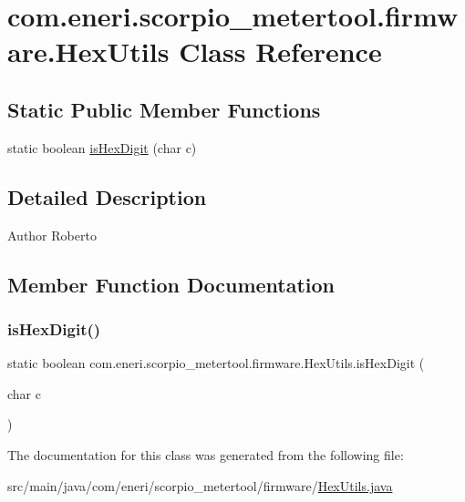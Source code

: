 \hypertarget{classcom_1_1eneri_1_1scorpio__metertool_1_1firmware_1_1_hex_utils}{}\section{com.\+eneri.\+scorpio\+\_\+metertool.\+firmware.\+Hex\+Utils Class Reference}
\label{classcom_1_1eneri_1_1scorpio__metertool_1_1firmware_1_1_hex_utils}
\subsection*{Static Public Member Functions}
\begin{DoxyCompactItemize}
\item 
static boolean \hyperlink{classcom_1_1eneri_1_1scorpio__metertool_1_1firmware_1_1_hex_utils_a7fb7793e8b93b4587f2b60de80c67e02}{is\+Hex\+Digit} (char c)
\end{DoxyCompactItemize}


\subsection{Detailed Description}
\begin{DoxyAuthor}{Author}
Roberto 
\end{DoxyAuthor}


\subsection{Member Function Documentation}
\mbox{\label{classcom_1_1eneri_1_1scorpio__metertool_1_1firmware_1_1_hex_utils_a7fb7793e8b93b4587f2b60de80c67e02}} 
\subsubsection{\texorpdfstring{is\+Hex\+Digit()}{isHexDigit()}}
{\footnotesize\ttfamily static boolean com.\+eneri.\+scorpio\+\_\+metertool.\+firmware.\+Hex\+Utils.\+is\+Hex\+Digit (\begin{DoxyParamCaption}\item[{char}]{c }\end{DoxyParamCaption})\hspace{0.3cm}{\ttfamily [static]}}



The documentation for this class was generated from the following file\+:\begin{DoxyCompactItemize}
\item 
src/main/java/com/eneri/scorpio\+\_\+metertool/firmware/\hyperlink{_hex_utils_8java}{Hex\+Utils.\+java}\end{DoxyCompactItemize}
